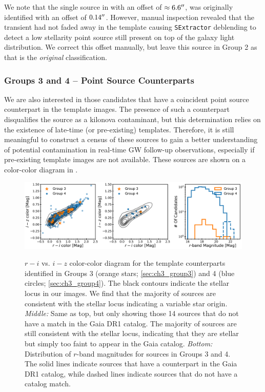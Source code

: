We note that the single source in  with an offset of $\approx6.6\hbox{$^{\prime\prime}$}$, was originally identified with an offset of $0.14\hbox{$^{\prime\prime}$}$. However, manual inspection revealed that the transient had not faded away in the template causing {\tt SExtractor} deblending to detect a low stellarity point source still present on top of the galaxy light distribution. We correct this offset manually, but leave this source in Group 2 as that is the {\it original} classification.

\clearpage
\subsubsection{Groups 3 and 4 -- Point Source Counterparts}
\label{sec:ch3_pointsources}
We are also interested in those candidates that have a coincident point source counterpart in the template images. The presence of such a counterpart disqualifies the source as a kilonova contaminant, but this determination relies on the existence of late-time (or pre-existing) templates.  Therefore, it is still meaningful to construct a census of these sources to gain a better understanding of potential contamination in real-time GW follow-up observations, especially if pre-existing template images are not available. These sources are shown on a color-color diagram in .

\begin{figure}[!t]
\begin{center}
\hspace*{-0.1in}
\scalebox{1.}
{\includegraphics[width=\textwidth]{./figs/chapter3/f2alt.pdf}}
\caption{ $r-i$ vs. $i-z$ color-color diagram for the template counterparts identified in Groups 3 (orange stars; \cref{sec:ch3_group3}) and 4 (blue circles; \cref{sec:ch3_group4}). The black contours indicate the stellar locus in our images. We find that the majority of sources are consistent with the stellar locus indicating a variable star origin.
{\it Middle:} Same as top, but only showing those 14 sources that do not have a match in the Gaia DR1 catalog. The majority of sources are still consistent with the stellar locus, indicating that they are stellar but simply too faint to appear in the Gaia catalog.
{\it Bottom:} Distribution of $r$-band magnitudes for sources in Groups 3 and 4. The solid lines indicate sources that have a counterpart in the Gaia DR1 catalog, while dashed lines indicate sources that do not have a catalog match.}
\label{fig:ch3_color_color}
\end{center}
\end{figure}

